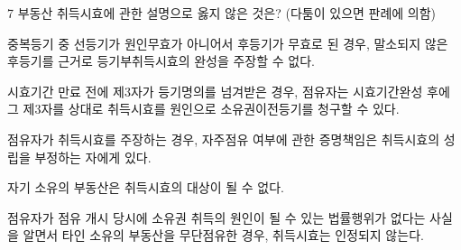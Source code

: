 \begin{question}{7}
부동산 취득시효에 관한 설명으로 옳지 않은 것은? (다툼이 있으면 판례에 의함)
\begin{choices}
  \item 중복등기 중 선등기가 원인무효가 아니어서 후등기가 무효로 된 경우, 말소되지 않은 후등기를 근거로 등기부취득시효의 완성을 주장할 수 없다.
  \item 시효기간 만료 전에 제3자가 등기명의를 넘겨받은 경우, 점유자는 시효기간완성 후에 그 제3자를 상대로 취득시효를 원인으로 소유권이전등기를 청구할 수 있다.
  \item 점유자가 취득시효를 주장하는 경우, 자주점유 여부에 관한 증명책임은 취득시효의 성립을 부정하는 자에게 있다.
  \item 자기 소유의 부동산은 취득시효의 대상이 될 수 없다.
  \item 점유자가 점유 개시 당시에 소유권 취득의 원인이 될 수 있는 법률행위가 없다는 사실을 알면서 타인 소유의 부동산을 무단점유한 경우, 취득시효는 인정되지 않는다.
\end{choices}
\end{question}
